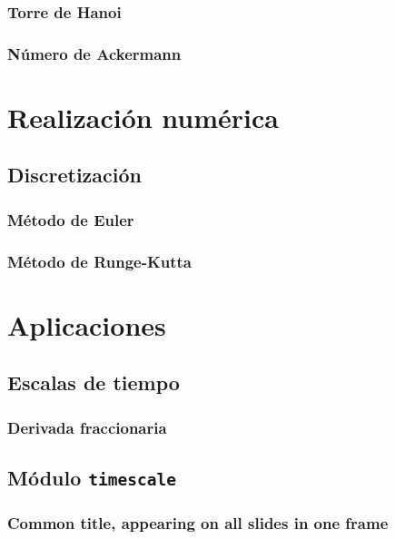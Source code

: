 \documentclass[spanish, utf8,handout]{beamer} %
\theoremstyle{definition}
\begin{document}
\subsubsection{Torre de Hanoi}
\subsubsection{Número de Ackermann}

\section{Realización numérica}

\subsection{Discretización}
\subsubsection{Método de Euler}
\subsubsection{Método de Runge-Kutta}

\section{Aplicaciones}

\subsection{Escalas de tiempo}
\subsubsection{Derivada fraccionaria}
\subsection{Módulo \texttt{timescale}}

\begin{frame}
	\frametitle{Common title, appearing on all slides in one frame}
\end{frame}
\end{document}
